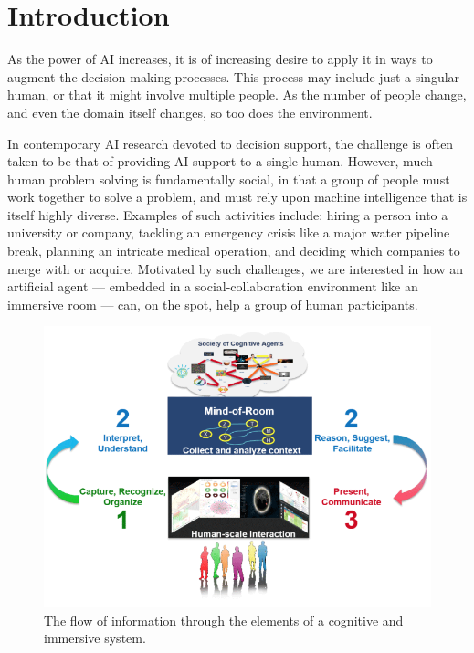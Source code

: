 \section{Introduction}

As the power of AI increases, it is of increasing desire to apply
it in ways to augment the decision making processes. This process
may include just a singular human, or that it might involve
multiple people. As the number of people change, and even the
domain itself changes, so too does the environment.

In contemporary AI research devoted to decision support, the challenge
is often taken to be that of providing AI support to a single human.
However, much human problem solving
is fundamentally social, in that a group of people must work together
to solve a problem, and must rely upon machine intelligence that is
itself highly diverse.  Examples of such activities include: hiring a
person into a university or company, tackling an emergency crisis like
a major water pipeline break, planning an intricate medical operation,
and deciding which companies to merge with or acquire.  Motivated by
such challenges, we are interested in how an artificial agent ---
embedded in a social-collaboration environment like an immersive room
--- can, on the spot, help a group of human participants.

\begin{figure}
\centering
\includegraphics[width=0.5\columnwidth]{chapters/01_introduction/figures/cisl-cycle-graphic.png}
\caption{The flow of information through the elements of a cognitive and immersive system.}
\label{fig:cycle-cais}
\end{figure}

